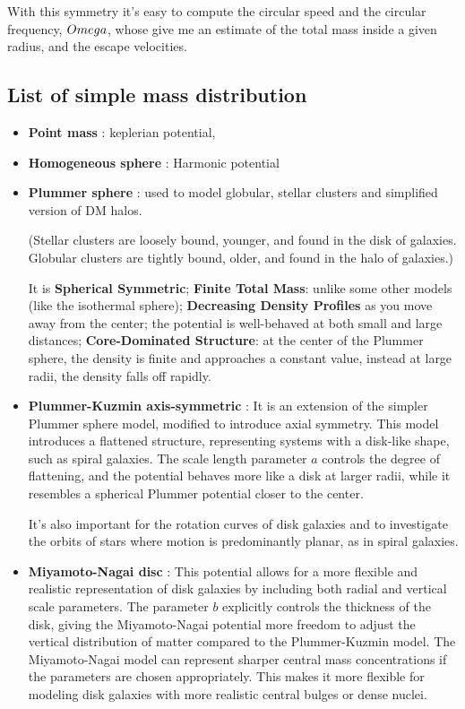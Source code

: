 \documentclass[a4paper,12pt]{article}
\begin{document}
With this symmetry it's easy to compute the circular speed and the circular frequency, $\\Omega$, whose give me an estimate of the total mass inside a given radius, and the escape velocities. 

\subsection{List of simple mass distribution}

\begin{itemize}

	\item \textbf{Point mass} : keplerian potential,
	
	\item \textbf{Homogeneous sphere} : Harmonic potential 

	\item \textbf{Plummer sphere} : used to model globular, stellar clusters and simplified version of DM halos.
	
	\small{(Stellar clusters are loosely bound, younger, and found in the disk of galaxies.
Globular clusters are tightly bound, older, and found in the halo of galaxies.)}

	It is \textbf{Spherical Symmetric}; \textbf{Finite Total Mass}: unlike some other models (like the isothermal sphere);  \textbf{Decreasing Density Profiles} as you move away from the center; the potential is well-behaved at both small and large distances; \textbf{Core-Dominated Structure}: at the center of the Plummer sphere, the density is finite and approaches a constant value, instead at large radii, the density falls off rapidly.
	
	\item \textbf{Plummer-Kuzmin axis-symmetric} : It is an extension of the simpler Plummer sphere model, modified to introduce axial symmetry. This model introduces a flattened structure, representing systems with a disk-like shape, such as spiral galaxies. The scale length parameter 
 $a$ controls the degree of flattening, and the potential behaves more like a disk at larger radii, while it resembles a spherical Plummer potential closer to the center.

It's also important for the rotation curves of disk galaxies and to investigate the orbits of stars where motion is predominantly planar, as in spiral galaxies.
	
	\item \textbf{Miyamoto-Nagai disc} : This potential allows for a more flexible and realistic representation of disk galaxies by including both radial and vertical scale parameters. The parameter $b$ explicitly controls the thickness of the disk, giving the Miyamoto-Nagai potential more freedom to adjust the vertical distribution of matter compared to the Plummer-Kuzmin model. The Miyamoto-Nagai model can represent sharper central mass concentrations if the parameters are chosen appropriately. This makes it more flexible for modeling disk galaxies with more realistic central bulges or dense nuclei.
 

\end{itemize}
\end{document}
